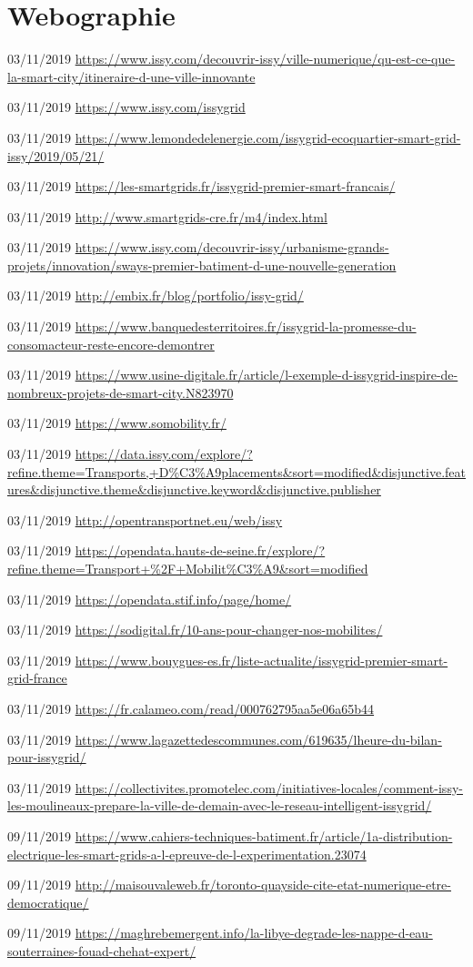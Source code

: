 \chapter*{Webographie}

03/11/2019
\url{https://www.issy.com/decouvrir-issy/ville-numerique/qu-est-ce-que-la-smart-city/itineraire-d-une-ville-innovante}

03/11/2019
\url{https://www.issy.com/issygrid}

03/11/2019
\url{https://www.lemondedelenergie.com/issygrid-ecoquartier-smart-grid-issy/2019/05/21/}

03/11/2019
\url{https://les-smartgrids.fr/issygrid-premier-smart-francais/}

03/11/2019
\url{http://www.smartgrids-cre.fr/m4/index.html}

03/11/2019
\url{https://www.issy.com/decouvrir-issy/urbanisme-grands-projets/innovation/sways-premier-batiment-d-une-nouvelle-generation}

03/11/2019
\url{http://embix.fr/blog/portfolio/issy-grid/}

03/11/2019
\url{https://www.banquedesterritoires.fr/issygrid-la-promesse-du-consomacteur-reste-encore-demontrer}

03/11/2019
\url{https://www.usine-digitale.fr/article/l-exemple-d-issygrid-inspire-de-nombreux-projets-de-smart-city.N823970}

03/11/2019
\url{https://www.somobility.fr/}

03/11/2019
\url{https://data.issy.com/explore/?refine.theme=Transports,+D\%C3\%A9placements\&sort=modified\&disjunctive.features\&disjunctive.theme\&disjunctive.keyword\&disjunctive.publisher}

03/11/2019
\url{http://opentransportnet.eu/web/issy}

03/11/2019
\url{https://opendata.hauts-de-seine.fr/explore/?refine.theme=Transport+\%2F+Mobilit\%C3\%A9\&sort=modified}

03/11/2019
\url{https://opendata.stif.info/page/home/}

03/11/2019
\url{https://sodigital.fr/10-ans-pour-changer-nos-mobilites/}

03/11/2019
\url{https://www.bouygues-es.fr/liste-actualite/issygrid-premier-smart-grid-france}

03/11/2019
\url{https://fr.calameo.com/read/000762795aa5e06a65b44}

03/11/2019
\url{https://www.lagazettedescommunes.com/619635/lheure-du-bilan-pour-issygrid/}

03/11/2019
\url{https://collectivites.promotelec.com/initiatives-locales/comment-issy-les-moulineaux-prepare-la-ville-de-demain-avec-le-reseau-intelligent-issygrid/}

09/11/2019
\url{https://www.cahiers-techniques-batiment.fr/article/1a-distribution-electrique-les-smart-grids-a-l-epreuve-de-l-experimentation.23074}

09/11/2019
\url{http://maisouvaleweb.fr/toronto-quayside-cite-etat-numerique-etre-democratique/}

09/11/2019
\url{https://maghrebemergent.info/la-libye-degrade-les-nappe-d-eau-souterraines-fouad-chehat-expert/}
